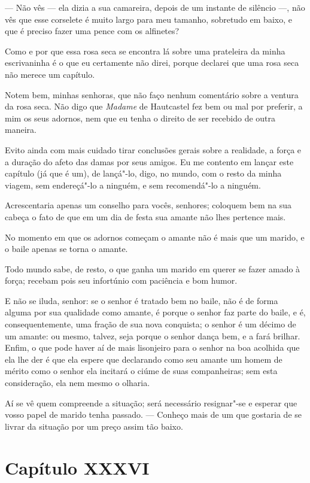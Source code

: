  --- Não vês --- ela dizia a sua camareira, depois de um instante de
silêncio ---, não vês que esse corselete é muito largo para meu
tamanho, sobretudo em baixo, e que é preciso fazer uma pence com os
alfinetes?

 Como e por que essa rosa seca se encontra lá sobre uma prateleira da
minha escrivaninha é o que eu certamente não direi, porque declarei que
uma rosa seca não merece um capítulo.

 Notem bem, minhas senhoras, que não faço nenhum comentário sobre a
ventura da rosa seca. Não digo que \textit{Madame} de Hautcastel fez
bem ou mal por preferir, a mim os seus adornos, nem que eu tenha o
direito de ser recebido de outra maneira. 

 Evito ainda com mais cuidado tirar conclusões gerais sobre a realidade,
a força e a duração do afeto das damas por seus amigos. Eu me contento
em lançar este capítulo (já que é um), de lançá"-lo, digo, no mundo, com
o resto da minha viagem, sem endereçá"-lo a ninguém, e sem recomendá"-lo
a ninguém.

 Acrescentaria apenas um conselho para vocês, senhores; coloquem bem na
sua cabeça o fato de que em um dia de festa sua amante não lhes
pertence mais.

 No momento em que os adornos começam o amante não é mais que um marido,
e o baile apenas se torna o amante.

 Todo mundo sabe, de resto, o que ganha um marido em querer se fazer
amado à força; recebam pois seu infortúnio com paciência e bom humor.

 E não se iluda, senhor: se o senhor é tratado bem no baile, não é de
forma alguma por sua qualidade como amante, é porque o senhor faz parte
do baile, e é, consequentemente, uma fração de sua nova conquista; o
senhor é um décimo de um amante: ou mesmo, talvez, seja porque o senhor
dança bem, e a fará brilhar. Enfim, o que pode haver aí de mais
lisonjeiro para o senhor na boa acolhida que ela lhe der é que ela
espere que declarando como seu amante um homem de mérito como o senhor
ela incitará o ciúme de suas companheiras; sem esta consideração, ela
nem mesmo o olharia. 

 Aí se vê quem compreende a situação; será necessário resignar"-se e
esperar que vosso papel de marido tenha passado. --- Conheço mais de um
que gostaria de se livrar da situação por um preço assim tão baixo.

\section*{Capítulo XXXVI}

